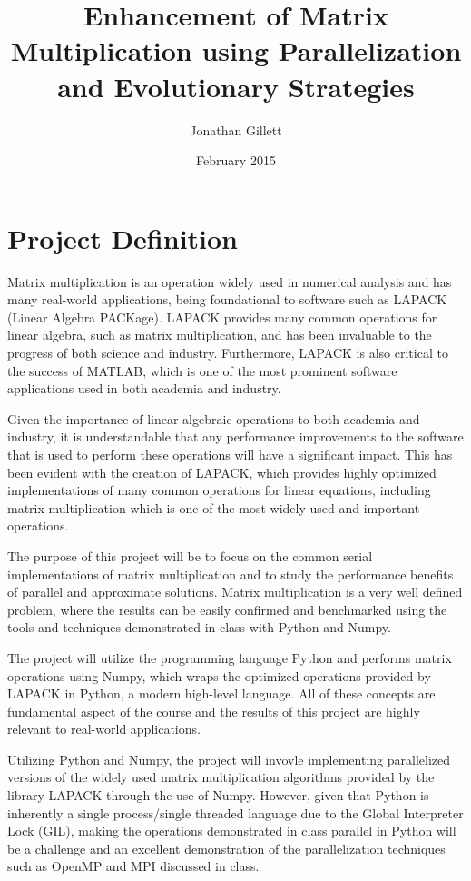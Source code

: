 \documentclass{article}
\title{Enhancement of Matrix Multiplication using Parallelization and Evolutionary Strategies}
\author{Jonathan Gillett}
\date{February 2015}
\begin{document}
\maketitle


\section{Project Definition}

Matrix multiplication is an operation widely used in numerical analysis and has many real-world applications, being foundational to software such as LAPACK (Linear Algebra PACKage)\cite{lapackweb}. LAPACK provides many common operations for linear algebra, such as matrix multiplication, and has been invaluable to the progress of both science and industry. Furthermore, LAPACK is also critical to the success of MATLAB\cite{matlab2000}, which is one of the most prominent software applications used in both academia and industry.

Given the importance of linear algebraic operations to both academia and industry, it is understandable that any performance improvements to the software that is used to perform these operations will have a significant impact\cite{note2002reducing, coppersmith1987matrix}. This has been evident with the creation of LAPACK\cite{anderson1990lapack}, which provides highly optimized implementations of many common operations for linear equations, including matrix multiplication which is one of the most widely used and important operations.

The purpose of this project will be to focus on the common serial implementations of matrix multiplication and to study the performance benefits of parallel and approximate solutions. Matrix multiplication is a very well defined problem, where the results can be easily confirmed and benchmarked using the tools and techniques demonstrated in class with Python and Numpy.

The project will utilize the programming language Python and performs matrix operations using Numpy, which wraps the optimized operations provided by LAPACK in Python, a modern high-level language\cite{van2011numpy}. All of these concepts are fundamental aspect of the course and the results of this project are highly relevant to real-world applications.

Utilizing Python and Numpy, the project will invovle implementing parallelized versions of the widely used matrix multiplication algorithms provided by the library LAPACK through the use of Numpy. However, given that Python is inherently a single process/single threaded language due to the Global Interpreter Lock (GIL)\cite{beazley2010understanding}, making the operations demonstrated in class parallel in Python will be a challenge and an excellent demonstration of the parallelization techniques such as OpenMP and MPI discussed in class.
\end{document}
